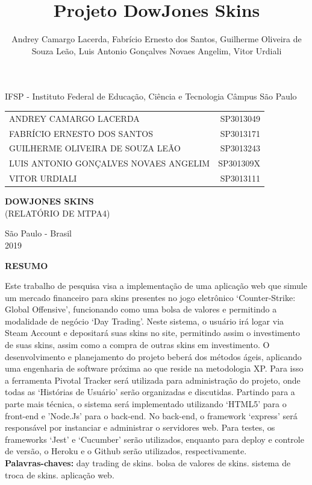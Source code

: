 \documentclass[a4paper, 12pt]{article}
\title{Projeto DowJones Skins}
\author{Andrey Camargo Lacerda, Fabrício Ernesto dos Santos, Guilherme Oliveira de Souza Leão, Luis Antonio Gonçalves Novaes Angelim, Vitor Urdiali}
\begin{document}
    \setlength{\parindent}{1.25cm}

    \thispagestyle{empty}
    \begin{center}
        \Large IFSP - Instituto Federal de Educação, Ciência e Tecnologia Câmpus São Paulo

        \vspace*{1.5 cm}

        \begin{tabular}{lr}
            \small ANDREY CAMARGO LACERDA & \small SP3013049 \\
            \small FABRÍCIO ERNESTO DOS SANTOS & \small SP3013171 \\
            \small GUILHERME OLIVEIRA DE SOUZA LEÃO & \small SP3013243 \\
            \small LUIS ANTONIO GONÇALVES NOVAES ANGELIM & \small SP301309X \\
            \small VITOR URDIALI & \small SP3013111 \\
        \end{tabular}

        \vspace*{5 cm}

        {\Large \bf DOWJONES SKINS} \\
        {\small (RELATÓRIO DE MTPA4)}

        \vspace*{6.1 cm}

        {\Large São Paulo - Brasil \\
        2019}
    \newpage %
    \begin{center}\Large \bf RESUMO \end{center}
    \end{center}
    \thispagestyle{empty}
    \begin{flushleft}
    Este trabalho de pesquisa visa a implementação de uma aplicação web que simule um mercado financeiro para skins presentes no jogo eletrônico ‘Counter-Strike: Global Offensive’, funcionando como uma bolsa de valores e permitindo a modalidade de negócio ‘Day Trading’. Neste sistema, o usuário irá logar via Steam Account e depositará suas skins no site, permitindo assim o investimento de suas skins, assim como a compra de outras skins em investimento. O desenvolvimento e planejamento do projeto beberá dos métodos ágeis, aplicando uma engenharia de software próxima ao que reside na metodologia XP. Para isso a ferramenta Pivotal Tracker será utilizada para administração do projeto, onde todas as ‘Histórias de Usuário’ serão organizadas e discutidas. Partindo para a parte mais técnica, o sistema será implementado utilizando ‘HTML5’ para o front-end e ’Node.Js’ para o back-end. No back-end, o framework ‘express’ será responsável por instanciar e administrar o servidores web. Para testes, os frameworks ‘Jest’ e ‘Cucumber’ serão utilizados, enquanto para deploy e controle de versão, o Heroku e o Github serão utilizados, respectivamente. \\
    
    \textbf{Palavras-chaves: } day trading de skins. bolsa de valores de skins. sistema de troca de skins. aplicação web.
    \end{flushleft}
\end{document}
